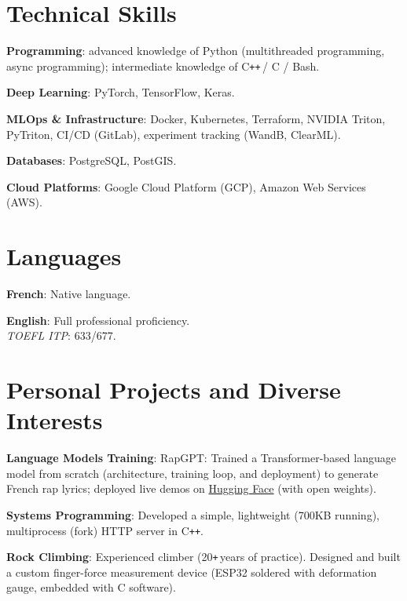 \documentclass[letterpaper,10pt]{article}
\newcommand{\resumeItem}[2]{
  \item\small{
    \textbf{#1}{: #2\vspace{-0.8pt}}
  }
}
\def\Plus{\texttt{+}}
\newcommand{\resumeSubItem}[2]{
    \small{\resumeItem{#1}{#2}\vspace{-4pt}}
	}
\newcommand{\resumeSubHeadingListStart}{\begin{itemize}[leftmargin=*]}
\newcommand{\resumeSubHeadingListEnd}{\end{itemize}}
\begin{document}
\begin{minipage}[t]{0.65\linewidth}
    \section{Technical Skills}
    \resumeSubHeadingListStart
		\resumeSubItem{Programming}{advanced knowledge of Python (multithreaded programming, async programming); intermediate knowledge of C\Plus\Plus \,/ C / Bash.}
    \resumeSubItem{Deep Learning}{PyTorch, TensorFlow, Keras.}
    \resumeSubItem{MLOps \& Infrastructure}{Docker, Kubernetes, Terraform, NVIDIA Triton, PyTriton, CI/CD (GitLab), experiment tracking (WandB, ClearML).}
    \resumeSubItem{Databases}{PostgreSQL, PostGIS.}
    \resumeSubItem{Cloud Platforms}{Google Cloud Platform (GCP), Amazon Web Services (AWS).}
    \resumeSubHeadingListEnd
    \end{minipage}
\hfill
\begin{minipage}[t]{0.3\linewidth}
    \section{Languages}
    \resumeSubHeadingListStart
    \resumeSubItem{French}{Native language.}
    \resumeSubItem{English}{Full professional proficiency. \\ \emph{TOEFL ITP}: 633/677.}
    \resumeSubHeadingListEnd
\end{minipage}



\section{Personal Projects and Diverse Interests}
\vspace{0.5mm}
\begin{minipage}[t]{0.9865\textwidth}
\resumeSubHeadingListStart
  \resumeSubItem{Language Models Training}{RapGPT: Trained a Transformer-based language model from scratch (architecture, training loop, and deployment) to generate French rap lyrics; deployed live demos on \href{https://huggingface.co/spaces/hugojarkoff/rapGPT}{Hugging Face} (with open weights).}
	\resumeSubItem{Systems Programming}{Developed a simple, lightweight (700KB running), multiprocess (fork) HTTP server in C\Plus\Plus.}
  \resumeSubItem{Rock Climbing}{Experienced climber (20\Plus\,years of practice). Designed and built a custom finger-force measurement device (ESP32 soldered with deformation gauge, embedded with C software).}
\resumeSubHeadingListEnd
\end{minipage}


\end{document}
